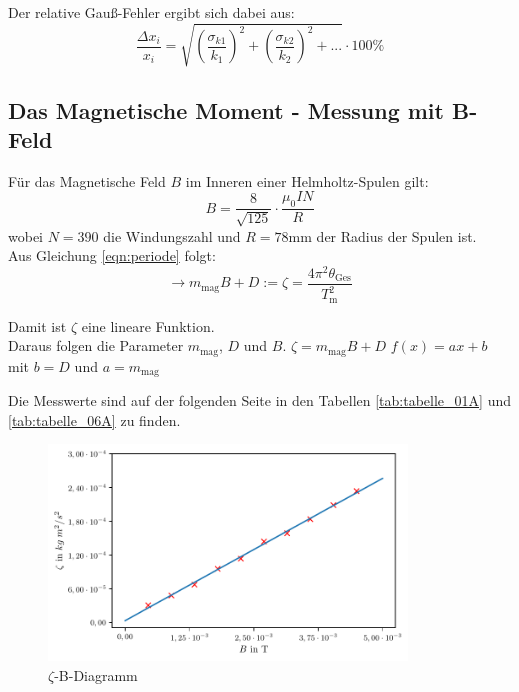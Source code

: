 Der relative Gauß-Fehler ergibt sich dabei aus:
\begin{equation}
    \frac{\Delta x_i}{x_i}=\sqrt{(\frac{\sigma_{k1}}{k_1})^2+(\frac{\sigma_{k2}}{k_2})^2+...} \cdot 100\%
    \label{eqn:relfehler}
\end{equation}

\newpage
\subsection{Das Magnetische Moment - Messung mit B-Feld}

Für das Magnetische Feld $B$ im Inneren einer Helmholtz-Spulen gilt:
\begin{equation}
    B= \frac{8}{\sqrt{125}} \cdot \frac{\mu_0 I N}{R}
\end{equation}
wobei $N=390$ die Windungszahl und $R=78$mm der Radius der Spulen ist.\\
Aus Gleichung \ref{eqn:periode}
folgt:
\begin{equation}
    \to m_\text{mag}B+D := \zeta = \frac{4\pi^2\theta_\text{Ges}}{T^2_\text{m}}
\end{equation}

Damit ist $\zeta$ eine lineare Funktion.\\ Daraus folgen die Parameter $m_\text{mag}$, $D$ und $B$.\newline
$\zeta = m_\text{mag}B + D$ \to $f(x)=ax+b$ mit $b = D$ und $a=m_\text{mag}$

Die Messwerte sind auf der folgenden Seite in den Tabellen \ref{tab:tabelle_01A} und \ref{tab:tabelle_06A}
zu finden.
\begin{figure}[h]
    \centering
    \includegraphics[width=0.85\textwidth, height=0.5\textwidth]{build/plot.pdf}
    \caption{$\zeta$-B-Diagramm}        
    \label{fig:Diagramm}
\end{figure}

